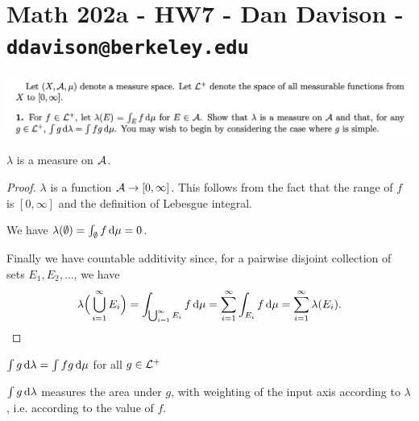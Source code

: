 \section*{Math 202a - HW7 - Dan Davison - \texttt{ddavison@berkeley.edu}}

\begin{mdframed}
\includegraphics[width=400pt]{img/analysis--berkeley-202a-hw07-9f9b.png}
\end{mdframed}

\begin{claim*}
  $\lambda$ is a measure on $\mathcal A$.
\end{claim*}
\begin{proof}
  $\lambda$ is a function $\mathcal A \to [0, \infty]$. This follows from the fact that the range of $f$
  is $[0, \infty]$ and the definition of Lebesgue integral.

  We have $\lambda(\emptyset) = \int_\emptyset f \d\mu = 0$.

  Finally we have countable additivity since, for a pairwise disjoint collection of sets $E_1, E_2, \ldots$, we
  have
  \begin{align*}
    \lambda\Big(\bigcup_{i=1}^\infty E_i\Big) = \int_{\bigcup_{i=1}^\infty E_i} f \d\mu = \sum_{i=1}^\infty \int_{E_i} f \d\mu = \sum_{i=1}^\infty \lambda(E_i).
  \end{align*}
\end{proof}

\begin{claim*}
  $\int g \d\lambda = \int f g \d\mu$ for all $g \in \mathcal L^+$
\end{claim*}

\begin{intuition*}
  $\int g \d\lambda$ measures the area under $g$, with weighting of the input axis according to $\lambda$, i.e.
  according to the value of $f$.
\end{intuition*}

